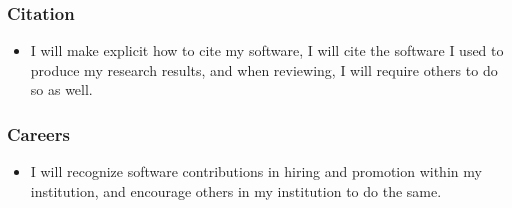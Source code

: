 \documentclass[a4paper,UKenglish]{dagman}
\renewcommand{\paragraph}[1]{\subsubsection*{#1}\xspace}
\begin{document}



\paragraph{Citation}
\begin{itemize}
\item I will make explicit how to cite my software, I will cite the software I used to produce my research results, and when reviewing, I will require others to do so as well.
\end{itemize}

\paragraph{Careers}
\begin{itemize}
\item I will recognize software contributions in hiring and promotion within my institution, and encourage others in my institution to do the same.
\end{itemize}
\end{document}
